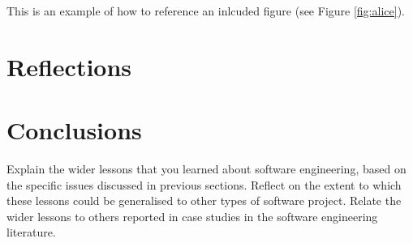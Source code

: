 \documentclass{l3proj}
\begin{document}
This is an example of how to reference an inlcuded figure (see Figure \ref{fig:alice}).

\section{Reflections}
\label{sec:reflections}


\section{Conclusions}
\label{sec:conclusions}

Explain the wider lessons that you learned about software engineering,
based on the specific issues discussed in previous sections.  Reflect
on the extent to which these lessons could be generalised to other
types of software project.  Relate the wider lessons to others
reported in case studies in the software engineering literature.



\end{document}
